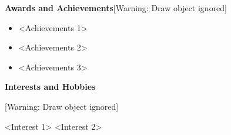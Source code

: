 \documentclass[a4paper]{article}
\newcommand\liststyleWWNumiv{%
\renewcommand\labelitemi{[F0B7?]}
\renewcommand\labelitemii{o}
\renewcommand\labelitemiii{[F0A7?]}
\renewcommand\labelitemiv{[F0B7?]}
}
\begin{document}
\bigskip

\textbf{Awards and Achievements}[Warning: Draw object ignored]

\liststyleWWNumiv
\begin{itemize}
\item {\textless}Achievements 1{\textgreater}
\item {\textless}Achievements 2{\textgreater}
\item {\textless}Achievements 3{\textgreater}
\end{itemize}

\bigskip


\bigskip

\textbf{Interests and Hobbies}

[Warning: Draw object ignored]

{\textless}Interest 1{\textgreater}\newline
{\textless}Interest 2{\textgreater} 
\end{document}
